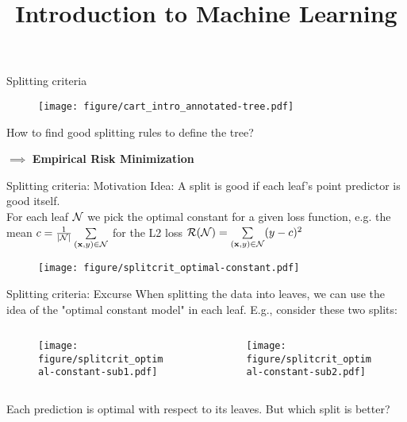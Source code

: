 \documentclass[11pt,compress,t,notes=noshow, xcolor=table]{beamer}
\title{Introduction to Machine Learning}
\institute{\href{https://compstat-lmu.github.io/lecture_i2ml/}{compstat-lmu.github.io/lecture\_i2ml}}
\date{}
\begin{document}
\sloppy


\begin{frame}{Splitting criteria}

 \begin{figure}
    \centering
      \texttt{[image: figure/cart\_intro\_annotated-tree.pdf]}
    \end{figure}

How to find good splitting rules to define the tree?
\lz

$\implies$ \textbf{Empirical Risk Minimization}

\end{frame}

\begin{vbframe}{Splitting criteria: Motivation}
Idea: A split is good if each leaf's point predictor is good itself. \\

For each leaf $\mathcal{N}$ we pick the optimal constant for a given loss function, e.g. the mean $c = \frac{1}{|\mathcal{N}|}\sum\limits_{(\mathbf{x}, y) \in \mathcal{N}}$ for the L2 loss $\mathcal{R}(\mathcal{N}) = \sum\limits_{(\mathbf{x}, y) \in \mathcal{N}} (y - c)^2$

\begin{figure}
\texttt{[image: figure/splitcrit\_optimal-constant.pdf]} 
\end{figure}



\end{vbframe}



\begin{vbframe}{Splitting criteria: Excurse}
When splitting the data into leaves, we can use the idea of the "optimal constant model" in each leaf. E.g., consider these two splits:

\begin{columns}
\begin{column}{0.5\textwidth}

\color{fgcolor}

\begin{figure}
\texttt{[image: figure/splitcrit\_optimal-constant-sub1.pdf]} 
\end{figure}

 
\end{column}
\begin{column}{0.5\textwidth}

\begin{figure}
\texttt{[image: figure/splitcrit\_optimal-constant-sub2.pdf]} 
\end{figure}

\end{column}
\end{columns}

Each prediction is optimal with respect to its leaves. But which split is better?

\end{vbframe}
\end{document}
